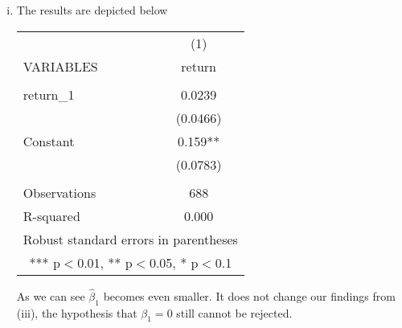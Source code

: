 \documentclass[a4paper]{article}
\begin{document}
\begin{enumerate}[(i)]
\item The results are depicted below
\begin{center}
\begin{tabular}{lc} \hline
	& (1) \\
	VARIABLES & return \\ \hline
	&  \\
	return\_1 & 0.0239 \\
	& (0.0466) \\
	Constant & 0.159** \\
	& (0.0783) \\
	&  \\
	Observations & 688 \\
	R-squared & 0.000 \\ \hline
	\multicolumn{2}{c}{ Robust standard errors in parentheses} \\
	\multicolumn{2}{c}{ *** p$<$0.01, ** p$<$0.05, * p$<$0.1} \\
\end{tabular}
\end{center}
As we can see $\hat{\beta}_1$ becomes even smaller. It does not change our findings from (iii), the hypothesis that $\beta_1 = 0$ still cannot be rejected.
\end{enumerate}
\end{document}
